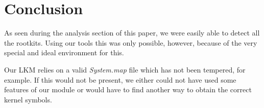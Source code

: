 \documentclass[10pt, letterpaper]{scrartcl}
\begin{document}
\section{Conclusion}\label{sec:conclusion}
As seen during the analysis section of this paper, we were easily able to detect all the rootkits. Using our tools this was only possible, however, because of the very special and ideal environment for this.

Our LKM relies on a valid \emph{System.map} file which has not been tempered, for example. If this would not be present, we either could not have used some features of our module or would have to find another way to obtain the correct kernel symbols.
\end{document}
